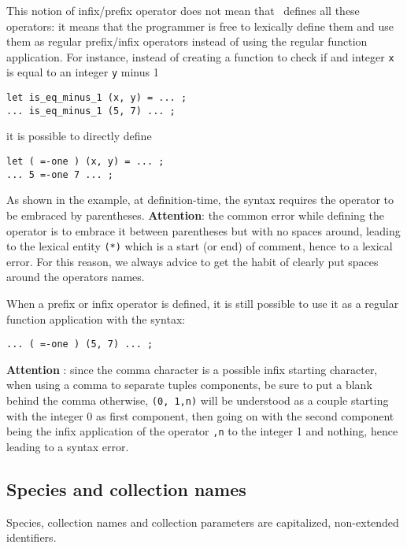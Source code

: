 \begin{itemize}
    This notion of infix/prefix operator does not mean that
    \focal\ defines all these operators: it means that the programmer
    is free to lexically define them and use them as regular
    prefix/infix operators instead of using the regular function
    application. For instance, instead of creating a function to check
    if and integer {\tt x} is equal to an integer {\tt y} minus 1
{\scriptsize
\begin{lstlisting}
let is_eq_minus_1 (x, y) = ... ;
... is_eq_minus_1 (5, 7) ... ;
\end{lstlisting}
}
    it is possible to directly define
{\scriptsize
\begin{lstlisting}
let ( =-one ) (x, y) = ... ;
... 5 =-one 7 ... ;
\end{lstlisting}
}
    As shown in the example, at definition-time, the syntax requires
    the operator to be embraced by parentheses. {\bf Attention}: the
    common error while defining the {\tt *} operator is to embrace it
    between parentheses but with no spaces around, leading to the
    lexical entity {\tt (*)} which is a start (or end) of comment,
    hence to a lexical error. For this reason, we always advice to
    get the habit of clearly put spaces around the operators names.

    When a prefix or infix operator is defined, it is still possible
    to use it as a regular function application with the syntax:
{\scriptsize
\begin{lstlisting}
... ( =-one ) (5, 7) ... ;
\end{lstlisting}
}

    {\bf Attention} : since the comma character is a possible infix
    starting character, when using a comma to separate tuples
    components, be sure to put a blank behind the comma otherwise,
    {\tt (0, 1,n)} will be understood as a couple starting with the
    integer 0 as first component, then going on with the second
    component being the infix application of the operator {\tt ,n} to
    the integer 1 and nothing, hence leading to a syntax error.

\end{itemize}



\subsection{Species and collection names}
 Species, collection
names and collection parameters are capitalized, non-extended
identifiers.



